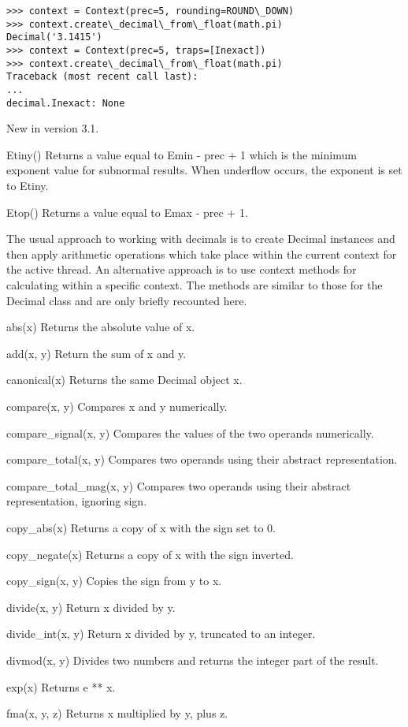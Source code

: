\begin{lstlisting}
>>> context = Context(prec=5, rounding=ROUND\_DOWN)
>>> context.create\_decimal\_from\_float(math.pi)
Decimal('3.1415')
>>> context = Context(prec=5, traps=[Inexact])
>>> context.create\_decimal\_from\_float(math.pi)
Traceback (most recent call last):
...
decimal.Inexact: None
\end{lstlisting}


New in version 3.1.

Etiny()
Returns a value equal to Emin - prec + 1 which is the minimum exponent value for subnormal results. When underflow occurs, the exponent is set to Etiny.

Etop()
Returns a value equal to Emax - prec + 1.

The usual approach to working with decimals is to create Decimal instances and then apply arithmetic operations which take place within the current context for the active thread. An alternative approach is to use context methods for calculating within a specific context. The methods are similar to those for the Decimal class and are only briefly recounted here.

abs(x)
Returns the absolute value of x.

add(x, y)
Return the sum of x and y.

canonical(x)
Returns the same Decimal object x.

compare(x, y)
Compares x and y numerically.

compare\_signal(x, y)
Compares the values of the two operands numerically.

compare\_total(x, y)
Compares two operands using their abstract representation.

compare\_total\_mag(x, y)
Compares two operands using their abstract representation, ignoring sign.

copy\_abs(x)
Returns a copy of x with the sign set to 0.

copy\_negate(x)
Returns a copy of x with the sign inverted.

copy\_sign(x, y)
Copies the sign from y to x.

divide(x, y)
Return x divided by y.

divide\_int(x, y)
Return x divided by y, truncated to an integer.

divmod(x, y)
Divides two numbers and returns the integer part of the result.

exp(x)
Returns e ** x.

fma(x, y, z)
Returns x multiplied by y, plus z.

